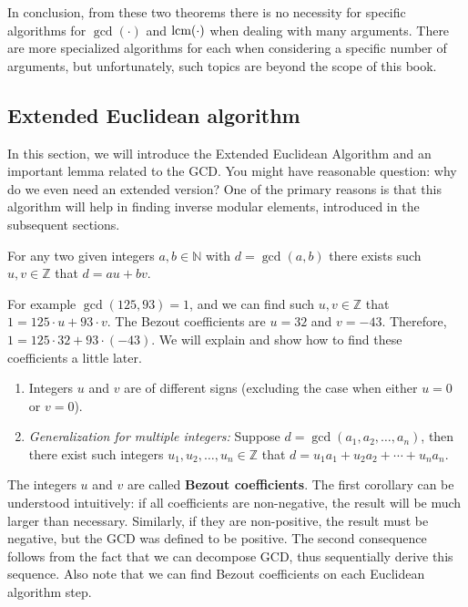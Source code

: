 \documentclass[../lecture-notes-148x210.tex]{subfiles}
\begin{document}
In conclusion, from these two theorems there is no necessity for specific
algorithms for $\gcd(\cdot)$ and $\text{lcm}(\cdot)$ when dealing with many arguments. There are
more specialized algorithms for each when considering a specific number of
arguments, but unfortunately, such topics are beyond the scope of this book.

\subsection{Extended Euclidean algorithm}

In this section, we will introduce the Extended Euclidean Algorithm and an
important lemma related to the GCD. You might have reasonable question: why do
we even need an extended version? One of the primary reasons is that this 
algorithm will help in finding inverse modular elements, introduced in the 
subsequent sections.

\begin{lemma}  \label{lemma:bezout_identity}
    For any two given integers $a, b \in \mathbb{N}$ with $d = \gcd(a, b)$ there exists such $u, v \in \mathbb{Z}$ that $d = au + bv$.
\end{lemma}

\begin{example}
    For example $\gcd(125, 93) = 1$, and we can find 
    such $u, v \in \mathbb{Z}$ that $1 = 125 \cdot u + 93 \cdot v$. 
    The Bezout coefficients are $u = 32$ and $v = -43$.
    Therefore, $1 = 125 \cdot 32 + 93 \cdot (-43)$.
    We will explain and show how to find these coefficients a little later.
\end{example}

\begin{corollary} 
    \hfill
    \begin{enumerate}
        \item Integers $u$ and $v$ are of different signs (excluding the case when either $u=0$ or $v=0$).
        \item \textit{Generalization for multiple integers:} Suppose $d = \gcd(a_1, a_2, \dots, a_n)$, then there exist such integers $u_1, u_2, \dots, u_n \in \mathbb{Z}$ that $d = u_1 a_1 + u_2 a_2 + \cdots + u_n a_n$.
    \end{enumerate}    
\end{corollary}

The integers $u$ and $v$ are called \textbf{Bezout coefficients}. The first
corollary can be understood intuitively: if all coefficients are non-negative,
the result will be much larger than necessary. Similarly, if they are
non-positive, the result must be negative, but the GCD was defined to be
positive. The second consequence follows from the fact that we can decompose
GCD, thus sequentially derive this sequence. Also note that we can find Bezout
coefficients on each Euclidean algorithm step.
\end{document}
